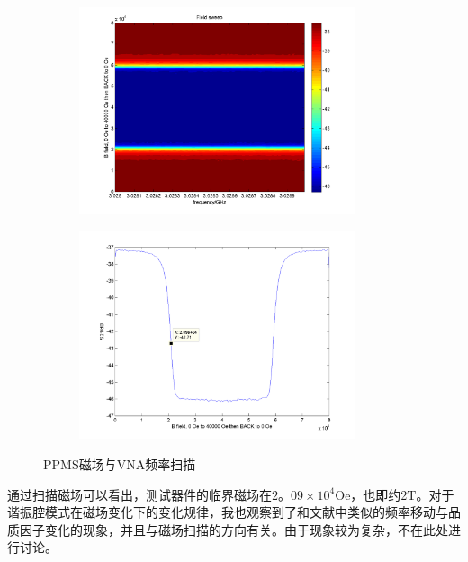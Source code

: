 \begin{figure}[h]
  \centering%
  \begin{subfigure}{0.4\textwidth}
    \includegraphics[width=3.2in]{figures/meas/Test_FieldSweep_start_3.0280GHz_stop_3.0290GHz_pow_-10.0dBm_minB_0G_maxB_40000G_numB_200_20170517T112932.png}
  \end{subfigure}%
  \hspace*{\fill}
  \begin{subfigure}{0.4\textwidth}
    \includegraphics[width=3.2in]{figures/meas/Test_S_vs_B_20170517T112932.png}
  \end{subfigure}
  \caption{PPMS磁场与VNA频率扫描}
  \label{fig:PPMSTestFieldSweep}
\end{figure}

                  通过扫描磁场可以看出，测试器件的临界磁场在$2。09\times 10^4$Oe，也即约2T。对于谐振腔模式在磁场变化下的变化规律，我也观察到了和文献中类似的频率移动与品质因子变化的现象，并且与磁场扫描的方向有关\cite{Song2009,Bothner2012}。由于现象较为复杂，不在此处进行讨论。


                        










